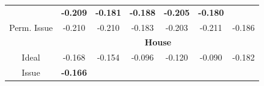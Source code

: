 \begin{table}
\begin{tabular}{|c|cccccc|}
    & \hspace{-4pt} \textbf{-0.209} \hspace{-5pt}
    & \hspace{-4pt} \textbf{-0.181} \hspace{-5pt}
    & \hspace{-4pt} \textbf{-0.188} \hspace{-5pt}
    & \hspace{-4pt} \textbf{-0.205} \hspace{-5pt}
    & \hspace{-4pt} \textbf{-0.180} \hspace{-4pt} \\
    \hspace{-5pt} Perm. Issue \hspace{-5pt}
    & \hspace{-4pt} -0.210 \hspace{-5pt}
    & \hspace{-4pt} -0.210 \hspace{-5pt}
    & \hspace{-4pt} -0.183 \hspace{-5pt}
    & \hspace{-4pt} -0.203 \hspace{-5pt}
    & \hspace{-4pt} -0.211 \hspace{-5pt}
    & \hspace{-4pt} -0.186 \hspace{-4pt} \\
    \hline
    \hline
    & \multicolumn{6}{|c|}{\textbf{House}} \\
    \hline
    Ideal & \hspace{-4pt} -0.168 \hspace{-5pt}
    & \hspace{-4pt} -0.154 \hspace{-5pt}
    & \hspace{-4pt} -0.096 \hspace{-5pt}
    & \hspace{-4pt} -0.120 \hspace{-5pt}
    & \hspace{-4pt} -0.090 \hspace{-5pt}
    & \hspace{-4pt} -0.182 \hspace{-4pt} \\
    Issue
    & \hspace{-4pt} \textbf{-0.166} \hspace{-5pt}

\end{tabular}
\end{table}
